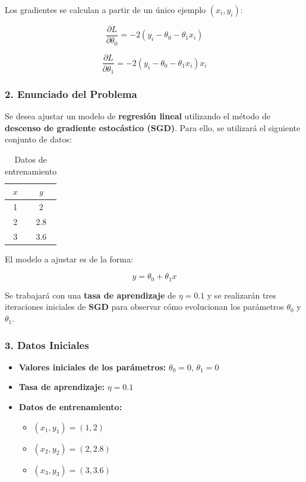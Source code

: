 \documentclass[a5paper]{article}
\begin{document}
	Los gradientes se calculan a partir de un único ejemplo \( (x_i, y_i) \):
	
	\[
	\frac{\partial L}{\partial \theta_0} = -2 (y_i - \theta_0 - \theta_1 x_i)
	\]
	
	\[
	\frac{\partial L}{\partial \theta_1} = -2 (y_i - \theta_0 - \theta_1 x_i) x_i
	\]
	
	\subsubsection*{2. Enunciado del Problema}
	
	Se desea ajustar un modelo de \textbf{regresión lineal} utilizando el método de \textbf{descenso de gradiente estocástico (SGD)}. Para ello, se utilizará el siguiente conjunto de datos:
	
	\begin{table}[h]
		\centering
		\begin{tabular}{|c|c|}
			\hline
			\( x \) & \( y \) \\
			\hline
			1 & 2 \\
			2 & 2.8 \\
			3 & 3.6 \\
			\hline
		\end{tabular}
		\caption{Datos de entrenamiento}
	\end{table}
	
	El modelo a ajustar es de la forma:
	
	\[
	y = \theta_0 + \theta_1 x
	\]
	
	Se trabajará con una \textbf{tasa de aprendizaje} de \( \eta = 0.1 \) y se realizarán tres iteraciones iniciales de \textbf{SGD} para observar cómo evolucionan los parámetros \( \theta_0 \) y \( \theta_1 \).
	
	\subsubsection*{3. Datos Iniciales}
	
	\begin{itemize}
		\item \textbf{Valores iniciales de los parámetros:} \( \theta_0 = 0 \), \( \theta_1 = 0 \)
		\item \textbf{Tasa de aprendizaje:} \( \eta = 0.1 \)
		\item \textbf{Datos de entrenamiento:}
		\begin{itemize}
			\item \( (x_1, y_1) = (1,2) \)
			\item \( (x_2, y_2) = (2,2.8) \)
			\item \( (x_3, y_3) = (3,3.6) \)
		\end{itemize}
	\end{itemize}
	
\end{document}
